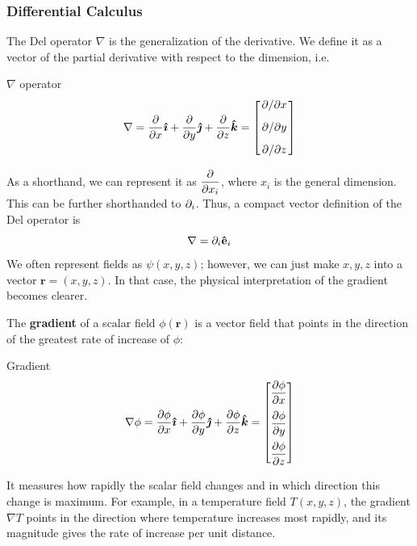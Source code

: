 	\subsubsection{Differential Calculus}
			The Del operator $\nabla$ is the generalization of the derivative. We define it as a vector of the partial derivative with respect to the dimension, i.e.
			\begin{definition}{$\nabla$ operator}
				\begin{equation}
					\nabla 
					= \pdv{}{x}\ihat + \pdv{}{y}\jhat + \pdv{}{z}\khat 
					= \mqty[
						\displaystyle\pdv*{}{x}\\[8pt]
						\displaystyle\pdv*{}{y}\\[8pt]
						\displaystyle\pdv*{}{z}
						]
			\end{equation}
			\end{definition}
			As a shorthand, we can represent it as $\displaystyle \pdv{}{x_i}$, where $x_i$ is the general dimension. This can be further shorthanded to $\partial_i$. Thus, a compact vector definition of the Del operator is
			\begin{equation}
				\nabla = \partial_i \vu{e}_i
			\end{equation}
			We often represent fields as $\psi(x,y,z)$; however, we can just make $x, y, z$ into a vector $\mathbf{r} = (x, y, z)$. In that case, the physical interpretation of the gradient becomes clearer.
			
			The \textbf{gradient} of a scalar field $\phi(\mathbf{r})$ is a vector field that points in the direction of the greatest rate of increase of $\phi$:
			\begin{definition}{Gradient}
				\begin{equation}
					\nabla \phi =
					\frac{\partial \phi}{\partial x} \vu*{\imath} +
					\frac{\partial \phi}{\partial y} \vu*{\jmath} +
					\frac{\partial \phi}{\partial z} \vu*{k}
					=
					\begin{bmatrix}
						\dfrac{\partial \phi}{\partial x}\\[10pt]
						\dfrac{\partial \phi}{\partial y}\\[10pt]
						\dfrac{\partial \phi}{\partial z}
					\end{bmatrix}
				\end{equation}
			\end{definition}
			It measures how rapidly the scalar field changes and in which direction this change is maximum. For example, in a temperature field $T(x,y,z)$, the gradient $\nabla T$ points in the direction where temperature increases most rapidly, and its magnitude gives the rate of increase per unit distance.
			
